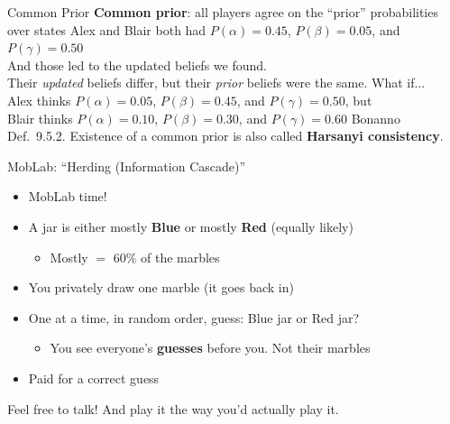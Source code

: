 \begin{frame}{Common Prior}
\textbf{Common prior}: all players agree on the ``prior'' probabilities over states
\bsk
Alex and Blair both had $P(\alpha)=0.45$, $P(\beta)=0.05$, and $P(\gamma)=0.50$\\
And those led to the updated beliefs we found.\\
Their \textit{updated} beliefs differ, but their \textit{prior} beliefs were the same.
\bsk
What if...\\
Alex thinks $P(\alpha)=0.05$, $P(\beta)=0.45$, and $P(\gamma)=0.50$, but\\
Blair thinks $P(\alpha)=0.10$, $P(\beta)=0.30$, and $P(\gamma)=0.60$
\bsk
{}
\bsk
{}
\vfill
{\footnotesize Bonanno Def.~9.5.2. Existence of a common prior is also called \textbf{Harsanyi consistency}.}
\vspace{-0.2in}
\end{frame}

\begin{frame}{MobLab: ``Herding (Information Cascade)''}
\begin{itemize}
    \item MobLab time!
    \item A jar is either mostly \textbf{Blue} or mostly \textbf{Red} (equally likely)
    \begin{itemize}
        \item Mostly $=$ 60\% of the marbles
    \end{itemize}
    \item You privately draw one marble (it goes back in)
    \item One at a time, in random order, guess: Blue jar or Red jar?
    \begin{itemize}
        \item You see everyone's \textbf{guesses} before you. Not their marbles
    \end{itemize}
    \item Paid for a correct guess
\end{itemize}
\vfill
\centering
Feel free to talk! And play it the way you'd actually play it.
\vspace{-0.2in}
\end{frame}

